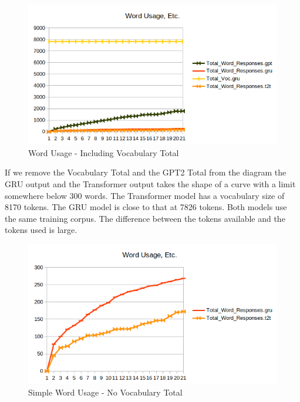 \begin{figure}[H]
	\begin{center}
		\includegraphics[scale=0.5]{Figure_5}
		
		
	\end{center}
	\caption[Word Usage]{Word Usage - Including Vocabulary Total}
	
	
\end{figure}

If we remove the Vocabulary Total and the GPT2 Total from the diagram the GRU output and the Transformer output takes the shape of a curve with a limit somewhere below 300 words. The Transformer model has a vocabulary size of 8170 tokens. The GRU model is close to that at 7826 tokens. Both models use the same training corpus. The difference between the tokens available and the tokens used is large.


\begin{figure}[H]
	\begin{center}
		\includegraphics[scale=0.5]{Figure_6}
		
		
	\end{center}
	\caption[Simple Word Usage]{Simple Word Usage - No Vocabulary Total}
	
	
\end{figure}

